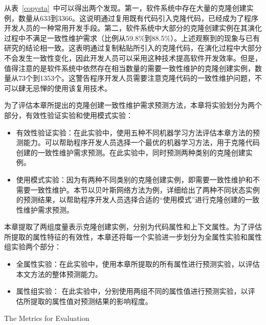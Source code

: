 从表~\ref{copysta}~中可以得出两个发现。第一，软件系统中存在大量的克隆创建实例，数量从633到3366。这说明通过复用既有代码引入克隆代码，已经成为了程序开发人员的一种常用开发手段。第二，软件系统中大部分的克隆创建实例在其演化过程中不满足一致性维护需求（比例从59.8\%到88.5\%）。上述观察到的现象与已有研究的结论相一致\cite{wang2014predicting}\cite{gode2011frequency}。这表明通过复制粘贴所引入的克隆代码，在演化过程中大部分不会发生一致性变化，因此开发人员可以采用这种技术提高软件开发效率。但是，值得注意的是软件系统中依然存在相当数量的需要一致性维护的克隆创建实例，数量从73个到1353个。这警告程序开发人员需要注意克隆代码的一致性维护问题，不可以肆无忌惮的使用该复用技术。


为了评估本章所提出的克隆创建一致性维护需求预测方法，本章将实验划分为两个部分，有效性验证实验和使用模式实验：
\begin{itemize}
\item
有效性验证实验：在此实验中，使用五种不同机器学习方法评估本章方法的预测能力。可以帮助程序开发人员选择一个最优的机器学习方法，用于克隆代码创建的一致性维护需求预测。在此实验中，同时预测两种类别的克隆创建实例。
\item
使用模式实验：因为有两种不同类别的克隆创建实例，即需要一致性维护和不需要一致性维护。本节以贝叶斯网络方法为例，详细给出了两种不同状态实例的预测结果，以帮助程序开发人员选择合适的“使用模式”进行克隆创建的一致性维护需求预测。
\end{itemize}

本章提取了两组度量表示克隆创建实例，分别为代码属性和上下文属性。为了评估所提取的属性特征的有效性，本章还将每一个实验进一步划分为全属性实验和属性组实验两个部分：
\begin{itemize}
\item
全属性实验：在此实验中，使用本章所提取的所有属性进行预测实验，以评估本文方法的整体预测能力。
\item
属性组实验：
在此实验中，分别使用两组不同的属性值进行预测实验，以评估所提取的属性值对预测结果的影响程度。
\end{itemize}

{The Metrics for Evaluation }
\label{ref-creatingmetrics}

